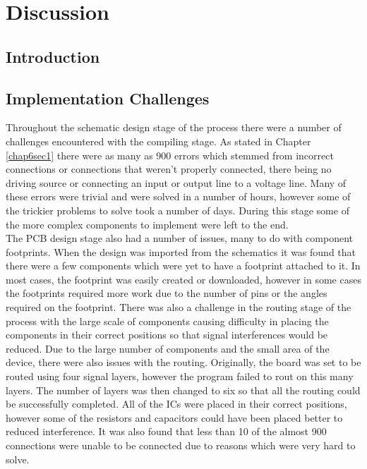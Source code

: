 
\chapter{Discussion} %

\label{Chapter7} %

\section{Introduction}

\section{Implementation Challenges}

	Throughout the schematic design stage of the process there were a number of challenges encountered with the compiling stage. 
As stated in Chapter \ref{chap6sec1} there were as many as 900 errors which stemmed from incorrect connections or connections that weren't properly connected, there being no driving source or connecting an input or output line to a voltage line. 
Many of these errors were trivial and were solved in a number of hours, however some of the trickier problems to solve took a number of days. 
During this stage some of the more complex components to implement were left to the end.\\

	The PCB design stage also had a number of issues, many to do with component footprints. 
When the design was imported from the schematics it was found that there were a few components which were yet to have a footprint attached to it. 
In most cases, the footprint was easily created or downloaded, however in some cases the footprints required more work due to the number of pins or the angles required on the footprint. 
There was also a challenge in the routing stage of the process with the large scale of components causing difficulty in placing the components in their correct positions so that signal interferences would be reduced. 
Due to the large number of components and the small area of the device, there were also issues with the routing. 
Originally, the board was set to be routed using four signal layers, however the program failed to rout on this many layers.
The number of layers was then changed to six so that all the routing could be successfully completed. 
All of the ICs were placed in their correct positions, however some of the resistors and capacitors could have been placed better to reduced interference. 
It was also found that less than 10 of the almost 900 connections were unable to be connected due to reasons which were very hard to solve.\\

